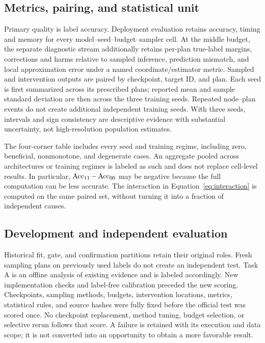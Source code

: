 \subsection{Metrics, pairing, and statistical unit}
Primary quality is label accuracy. Deployment evaluation retains accuracy, timing and memory for every model--seed--budget--sampler cell. At the middle budget, the separate diagnostic stream additionally retains per-plan true-label margins, corrections and harms relative to sampled inference, prediction mismatch, and local approximation error under a named coordinate/estimator metric. Sampled and intervention outputs are paired by checkpoint, target ID, and plan. Each seed is first summarized across its prescribed plans; reported mean and sample standard deviation are then across the three training seeds. Repeated node--plan events do not create additional independent training seeds. With three seeds, intervals and sign consistency are descriptive evidence with substantial uncertainty, not high-resolution population estimates.

The four-corner table includes every seed and training regime, including zero, beneficial, nonmonotone, and degenerate cases. An aggregate pooled across architectures or training regimes is labeled as such and does not replace cell-level results. In particular, $\operatorname{Acc}_{11}-\operatorname{Acc}_{00}$ may be negative because the full computation can be less accurate. The interaction in Equation~\eqref{eq:interaction} is computed on the same paired set, without turning it into a fraction of independent causes.

\subsection{Development and independent evaluation}
Historical fit, gate, and confirmation partitions retain their original roles. Fresh sampling plans on previously used labels do not create an independent test. Task A is an offline analysis of existing evidence and is labeled accordingly. New implementation checks and label-free calibration preceded the new scoring. Checkpoints, sampling methods, budgets, intervention locations, metrics, statistical rules, and source hashes were fully fixed before the official test was scored once. No checkpoint replacement, method tuning, budget selection, or selective rerun follows that score. A failure is retained with its execution and data scope; it is not converted into an opportunity to obtain a more favorable result.

